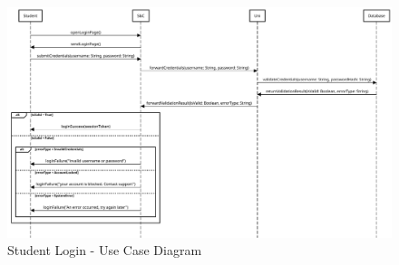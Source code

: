\begin{figure}[H]
    \centering
    \includegraphics[width=1.0\textwidth]{Images/UC_1.pdf}
    \caption{Student Login - Use Case Diagram}
    \label{fig:use-case-diagram-1}
\end{figure}


